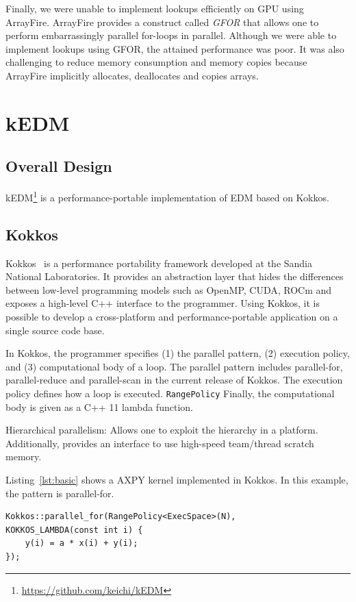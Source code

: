 \documentclass[conference]{IEEEtran}
\begin{document}
Finally, we were unable to implement lookups efficiently on GPU using
ArrayFire. ArrayFire provides a construct called \textit{GFOR} that allows one
to perform embarrassingly parallel for-loops in parallel. Although we were
able to implement lookups using GFOR, the attained performance was poor. It
was also challenging to reduce memory consumption and memory copies because
ArrayFire implicitly allocates, deallocates and copies arrays.

\section{kEDM}

\subsection{Overall Design}

kEDM\footnote{\url{https://github.com/keichi/kEDM}} is a performance-portable
implementation of EDM based on Kokkos.

\subsection{Kokkos}

Kokkos~\cite{Edwards2014} is a performance portability framework developed at
the Sandia National Laboratories. It provides an abstraction layer that hides
the differences between low-level programming models such as OpenMP, CUDA,
ROCm and exposes a high-level C++ interface to the programmer. Using Kokkos,
it is possible to develop a cross-platform and performance-portable
application on a single source code base.

In Kokkos, the programmer specifies (1) the parallel pattern, (2) execution
policy, and (3) computational body of a loop. The parallel pattern includes
parallel-for, parallel-reduce and parallel-scan in the current release of
Kokkos. The execution policy defines how a loop is executed.
\texttt{RangePolicy}
Finally, the computational body is given as a C++ 11 lambda function.

Hierarchical parallelism: Allows one to exploit the hierarchy in a
    platform. Additionally, provides an interface to use high-speed
    team/thread scratch memory.

Listing~\ref{lst:basic} shows a AXPY kernel implemented in Kokkos.
In this example, the pattern is parallel-for.

\begin{lstlisting}[caption={Basic data parallel loop},label={lst:basic}]
Kokkos::parallel_for(RangePolicy<ExecSpace>(N),
KOKKOS_LAMBDA(const int i) {
    y(i) = a * x(i) + y(i);
});
\end{lstlisting}
\end{document}
